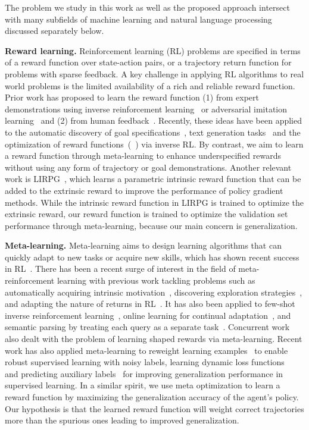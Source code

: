 The problem we study in this work as well as the proposed approach intersect with
many subfields of machine learning and natural language processing
discussed separately below.

{\bf Reward learning.}
Reinforcement learning (RL) problems are specified in terms of a
reward function over state-action pairs,
or a trajectory return function for problems with sparse feedback.
A key challenge in applying RL algorithms to real world problems
is the limited availability of a rich and reliable reward function.
Prior work has proposed to learn the reward function
(1) from expert demonstrations using inverse reinforcement
learning~\cite{abbeel2004apprenticeship,ziebart2008maximum} or
adversarial imitation learning~\cite{ho2016generative} and (2) from
human feedback~\cite{christiano2017deep,leike2018scalable,ibarz2018reward}.
Recently, these ideas have been applied to the automatic discovery of goal
specifications~\cite{xie2018few,bahdanau19}, text generation tasks~\cite{wang2018no,wu2017sequence,bosselut2018discourse} and the
optimization of reward functions~(\eg~\citet{gleave2018multi,fu19, shi2018towards})
via inverse RL.
By contrast, we aim to learn a reward function through
meta-learning to enhance underspecified rewards without using any form
of trajectory or goal demonstrations.
Another relevant work is LIRPG~\cite{zheng2018learning}, which
learns a parametric intrinsic reward function that can be added to the
extrinsic reward to improve the performance of policy gradient methods.
While the intrinsic reward function in LIRPG is trained to optimize the extrinsic reward, our reward function is trained to optimize the validation set performance through meta-learning, because our main concern is generalization.

{\bf Meta-learning.}
Meta-learning aims to design learning algorithms that can quickly
adapt to new tasks or acquire new skills,
which has shown recent success in
RL~\cite{finn2017model,duan2016rl,wang2016learning,nichol2018reptile}.
There has been a recent surge of interest in the field of meta-reinforcement
learning with previous work tackling problems such as automatically acquiring intrinsic
motivation~\cite{zheng2018learning}, discovering exploration
strategies~\cite{gupta2018meta, xu2018learning}, and adapting the nature of returns in
RL~\cite{xu2018meta}. It has also been applied to few-shot inverse reinforcement learning~\cite{xu2018few},
online learning for continual adaptation~\cite{nagabandi2018deep},
and semantic parsing by treating each query as a separate task~\cite{huang2018NaturalLT}.
Concurrent work~\cite{zou2019reward} also dealt with the problem of learning shaped
rewards via meta-learning.
Recent work has also applied meta-learning to reweight learning examples~\cite{ren2018learning}
to enable robust supervised learning with noisy labels, learning dynamic loss functions~\cite{wu2018learning}
and predicting auxiliary labels~\cite{liu2019self}
for improving generalization performance in supervised learning.
In a similar spirit, we use meta optimization to learn a reward function by maximizing the
generalization accuracy of the agent's policy. Our hypothesis is that
the learned reward function will weight correct trajectories more than
the spurious ones leading to improved generalization.

